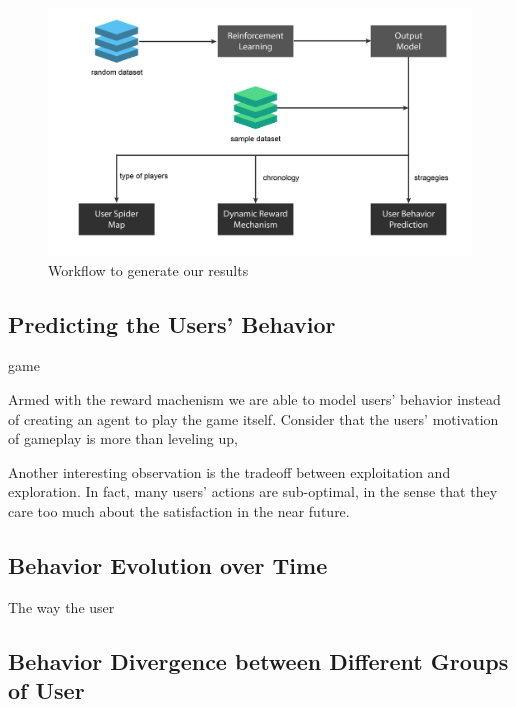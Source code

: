 \documentclass{sigchi}
\begin{document}
\begin{figure}[t]
    \centering
    \includegraphics[width=\textwidth]{figs/results.jpg}
    \caption{Workflow to generate our results}
    \label{fig:results}
\end{figure}


\subsection{Predicting the Users' Behavior}

game



Armed with the reward machenism we are able to model users' behavior instead of creating an agent to play the game itself. Consider that the users' motivation of gameplay is more than leveling up, 

Another interesting observation is the tradeoff between exploitation and exploration. In fact, many users' actions are sub-optimal, in the sense that they care too much about the satisfaction in the near future.

\subsection{Behavior Evolution over Time}

The way the user 

\subsection{Behavior Divergence between Different Groups of User}




\end{document}
